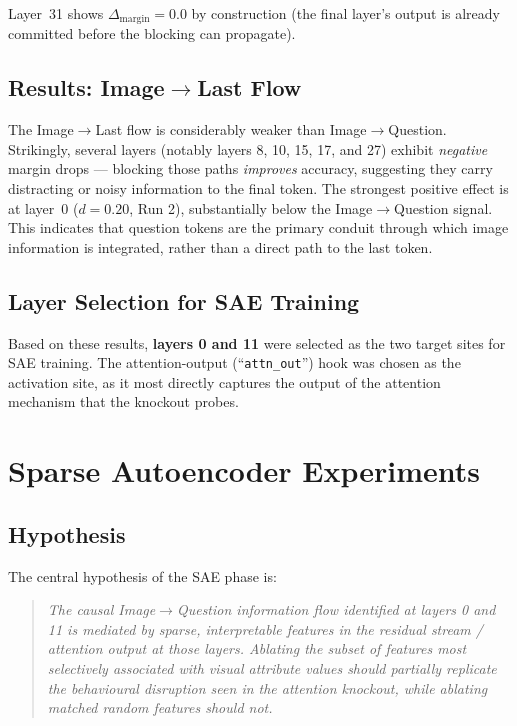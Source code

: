 \documentclass[11pt,a4paper]{article}
\begin{document}
Layer~31 shows $\Delta_{\mathrm{margin}} = 0.0$ by construction (the final layer's output is
already committed before the blocking can propagate).

\subsection{Results: Image$\to$Last Flow}

The Image$\to$Last flow is considerably weaker than Image$\to$Question.
Strikingly, several layers (notably layers 8, 10, 15, 17, and 27) exhibit \emph{negative} margin
drops — blocking those paths \emph{improves} accuracy, suggesting they carry distracting or noisy
information to the final token. The strongest positive effect is at layer~0
($d = 0.20$, Run 2), substantially below the Image$\to$Question signal.
This indicates that question tokens are the primary conduit through which image information is
integrated, rather than a direct path to the last token.

\subsection{Layer Selection for SAE Training}

Based on these results, \textbf{layers 0 and 11} were selected as the two target sites for SAE
training. The attention-output (``\texttt{attn\_out}'') hook was chosen as the activation site,
as it most directly captures the output of the attention mechanism that the knockout probes.


\section{Sparse Autoencoder Experiments}
\label{sec:sae}

\subsection{Hypothesis}

The central hypothesis of the SAE phase is:

\begin{quote}
\emph{The causal Image$\to$Question information flow identified at layers 0 and 11 is mediated by
sparse, interpretable features in the residual stream / attention output at those layers.
Ablating the subset of features most selectively associated with visual attribute values should
partially replicate the behavioural disruption seen in the attention knockout, while ablating
matched random features should not.}
\end{quote}
\end{document}
